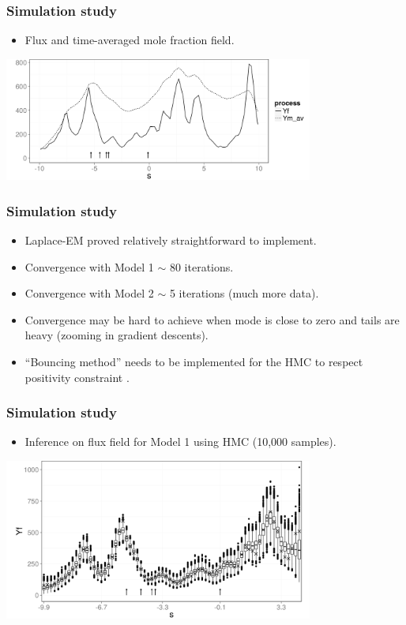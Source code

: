 \documentclass{beamer}
\begin{document}
\begin{frame}
\frametitle{Simulation study}

\begin{itemize}
\item Flux and time-averaged mole fraction field.
\end{itemize}

\begin{center}
\includegraphics[width=4in]{Sim_plot.png}
\end{center}
\end{frame}

\begin{frame}
\frametitle{Simulation study}

\begin{itemize}
\item Laplace-EM proved relatively straightforward to implement.
\item Convergence with Model 1 $\sim$ 80 iterations.
\item Convergence with Model 2 $\sim$ 5 iterations (much more data).
\item Convergence may be hard to achieve when mode is close to zero and tails are heavy (zooming in gradient descents).
\item ``Bouncing method'' needs to be implemented for the HMC to respect positivity constraint \citep{Neal_2011}.
\end{itemize}
\end{frame}


\begin{frame}
\frametitle{Simulation study}

\begin{itemize}
\item Inference on flux field for Model 1 using HMC (10,000 samples).
\end{itemize}

\begin{center}
\includegraphics[width=4in]{Sim1_samples.png}
\end{center}
\end{frame}
\end{document}
